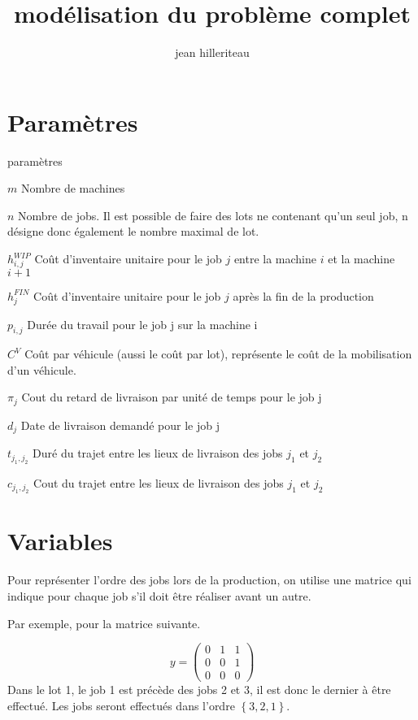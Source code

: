 \documentclass{article}
\begin{document}
\title{modélisation du problème complet}

\author{jean hilleriteau}
\maketitle

\section*{Paramètres}
\begin{labeling}{paramètres}

	\item [$m$]
	Nombre de machines
	\item [$n$]
	Nombre de jobs.
	Il est possible de faire des lots ne contenant qu’un seul job,
	n désigne donc également le nombre maximal de lot.
	\item [$h_{i,j}^{WIP}$]
	Coût d’inventaire unitaire pour le job $j$ entre la machine $i$ et la machine $i+1$
	\item [$h_j^{FIN}$]
	Coût d’inventaire unitaire pour le job $j$ après la fin de la production
	\item [$p_{i,j}$]
	Durée du travail pour le job j sur la machine i
	\item [$C^V$]
	Coût par véhicule (aussi le coût par lot), représente le coût de la mobilisation d’un véhicule.
	\item [$\pi_j$]
	Cout du retard de livraison par unité de temps pour le job j
	\item [$d_j$]
	Date de livraison demandé pour le job j
	\item [$t_{j_1,j_2}$]
	Duré du trajet entre les lieux de livraison des jobs $j_1$ et $j_2$
	\item [$c_{j_1,j_2}$]
	Cout du trajet entre les lieux de livraison des jobs $j_1$ et $j_2$
\end{labeling}


\section*{Variables}

Pour représenter l’ordre des jobs lors de la production, on utilise une matrice qui indique pour chaque job s’il doit être réaliser avant un autre.

Par exemple, pour la matrice suivante.

$$
	y=
	\begin{pmatrix}
		0 & 1 & 1 \\
		0 & 0 & 1 \\
		0 & 0 & 0
	\end{pmatrix}
$$
Dans le lot 1, le job 1 est précède des jobs 2 et 3, il est donc le dernier à être effectué. Les jobs seront effectués dans l’ordre $\left\{3,2,1\right\}$.
\end{document}
